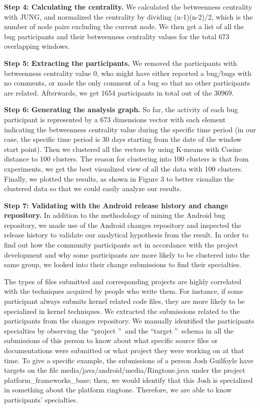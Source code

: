 \documentclass[10pt, conference, compsocconf]{IEEEtran}
\begin{document}
\textbf{Step 4: Calculating the centrality.} We calculated the
betweenness centrality with JUNG, and normalized the centrality by
dividing (n-1)(n-2)/2, which is the number of node pairs excluding the
current node. We then get a list of all the bug participants and their
betweenness centrality values for the total 673 overlapping windows.


\textbf{Step 5: Extracting the participants.} We removed the
participants with betweenness centrality value 0, who might have
either reported a bug/bugs with no comments, or made the only comment
of a bug so that no other participants are related. Afterwards, we get
1654 participants in total out of the 30969.


\textbf{Step 6: Generating the analysis graph.} So far, the activity
of each bug participant is represented by a 673 dimensions vector with
each element indicating the betweenness centrality value during the
specific time period (in our case, the specific time period is 30 days
starting from the date of the window start point). Then we clustered
all the vectors by using K-means with Cosine distance to 100
clusters. The reason for clustering into 100 clusters is that from
experiments, we get the best visualized view of all the data with 100
clusters. Finally, we plotted the results, as shown in Figure 3 to
better visualize the clustered data so that we could easily analyze
our results.


\textbf{Step 7: Validating with the Android release history and change
  repository.} In addition to the methodology of mining the Android
bug repository, we made use of the Android changes repository and
inspected the release history to validate our analytical hypothesis
from the result. In order to find out how the community participants
act in accordance with the project development and why some
participants are more likely to be clustered into the same group, we
looked into their change submissions to find their specialties.


The types of files submitted and corresponding projects are highly
correlated with the techniques acquired by people who write them. For
instance, if some participant always submits kernel related code
files, they are more likely to be specialized in kernel techniques. We
extracted the submissions related to the participants from the changes
repository. We manually identified the participants specialties by
observing the \textquotedblleft project \textquotedblright \ and the
\textquotedblleft target \textquotedblright \ schema in all the
submissions of this person to know about what specific source files or
documentations were submitted or what project they were working on at
that time. To give a specific example, the submissions of a person
Josh Guilfoyle have targets on the file
media/java/android/media/Ringtone.java under the project
platform\_frameworks\_base; then, we would identify that this Josh is
specialized in something about the platform ringtone. 
Therefore, we are able to know participants' specialties.
\end{document}
